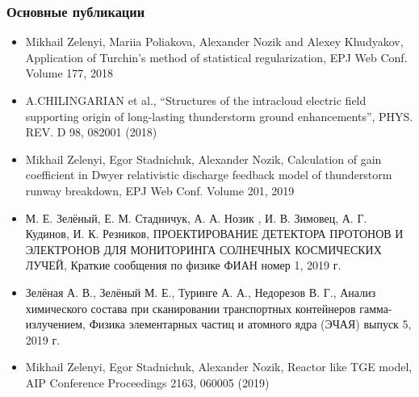 %
%
 \begin{frame} %
    \frametitle{Основные публикации}
{\small     \begin{itemize}
        \item Mikhail Zelenyi, Mariia Poliakova, Alexander Nozik and Alexey Khudyakov, Application of Turchin's method of statistical regularization, EPJ Web Conf. Volume 177, 2018
        
        \item A.CHILINGARIAN et al., “Structures of the intracloud electric field supporting origin of long-lasting thunderstorm ground enhancements”, PHYS. REV. D 98, 082001 (2018)
        
        \item Mikhail Zelenyi, Egor Stadnichuk, Alexander Nozik, Calculation of gain coefficient in Dwyer relativistic discharge feedback model of thunderstorm runway breakdown, EPJ Web Conf. Volume 201, 2019
        
        \item М. Е. Зелёный, Е. М. Стадничук, А. А. Нозик , И. В. Зимовец, А. Г. Кудинов, И. К. Резников, ПРОЕКТИРОВАНИЕ ДЕТЕКТОРА ПРОТОНОВ И ЭЛЕКТРОНОВ ДЛЯ МОНИТОРИНГА СОЛНЕЧНЫХ КОСМИЧЕСКИХ ЛУЧЕЙ, Краткие сообщения по физике ФИАН номер 1, 2019 г.
        
        \item Зелёная А. В., Зелёный М. Е., Туринге А. А., Недорезов В. Г., Анализ химического состава при сканировании транспортных контейнеров гамма-излучением, Физика элементарных частиц и атомного ядра (ЭЧАЯ) выпуск 5, 2019 г.
        
        \item Mikhail Zelenyi, Egor Stadnichuk, Alexander Nozik, Reactor like TGE model, AIP Conference Proceedings 2163, 060005 (2019)
    \end{itemize}}
\end{frame}
